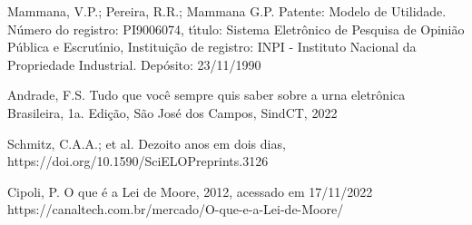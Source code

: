 \documentclass[
12pt,		%
openright,	%
twoside,  %
a4paper,			%
chapter=TITLE,		%
english,			%
french,				%
spanish,			%
brazil				%
]{USPSC-classe/USPSC}
\begin{document}
\begin{flushleft}
\begin{flushleft}
\begin{flushleft}
\begin{flushleft}
[MAMMANA et al., 1990] Mammana, V.P.; Pereira, R.R.; Mammana G.P. Patente: Modelo de Utilidade. N\'umero do registro: PI9006074, t\'{\i}tulo: \textquotedbl Sistema Eletr\^onico de Pesquisa de Opini\~ao P\'ublica e Escrut\'{\i}nio\textquotedbl  , Institui\c{c}\~ao de registro: INPI - Instituto Nacional da Propriedade Industrial. Dep\'osito: 23/11/1990
\end{flushleft}


\end{flushleft}


\end{flushleft}


\end{flushleft}


\begin{flushleft}
\begin{flushleft}
\begin{flushleft}
\begin{flushleft}
[ANDRADE, 2022] Andrade, F.S. Tudo que voc\^e sempre quis saber sobre a urna eletr\^onica Brasileira, 1a. Edi\c{c}\~ao, S\~ao Jos\'e dos Campos, SindCT, 2022
\end{flushleft}


\end{flushleft}


\end{flushleft}


\end{flushleft}


\begin{flushleft}
\begin{flushleft}
\begin{flushleft}
\begin{flushleft}
[Schmitz et al., 2021] Schmitz, C.A.A.; et al. Dezoito anos em dois dias, https://doi.org/10.1590/SciELOPreprints.3126
\end{flushleft}


\end{flushleft}


\end{flushleft}


\end{flushleft}


\begin{flushleft}
\begin{flushleft}
\begin{flushleft}
\begin{flushleft}
[CIPOLI, 2012] Cipoli, P. O que \'e a Lei de Moore, 2012, acessado em 17/11/2022 https://canaltech.com.br/mercado/O-que-e-a-Lei-de-Moore/
\end{flushleft}


\end{flushleft}


\end{flushleft}


\end{flushleft}
\end{document}
